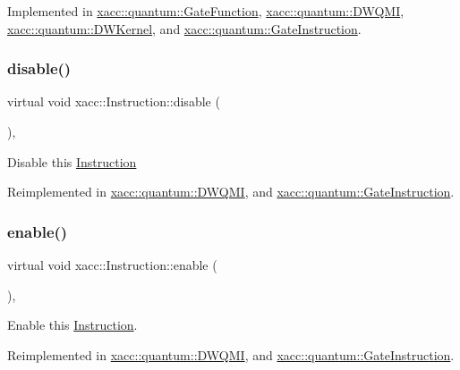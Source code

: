 Implemented in \hyperlink{a01249_aba03de68b76a9e120705c3c389c714a1}{xacc\+::quantum\+::\+Gate\+Function}, \hyperlink{a01225_a76939c29e4763d10c57ea9a270229421}{xacc\+::quantum\+::\+D\+W\+Q\+MI}, \hyperlink{a01221_adae68964db6acd8b4c2267c270a8ec58}{xacc\+::quantum\+::\+D\+W\+Kernel}, and \hyperlink{a01253_ad32ad03dfc516e00093030e60178003d}{xacc\+::quantum\+::\+Gate\+Instruction}.

\mbox{\label{a01657_a6e528da15e05a94cc1d7db268c483271}} 
\subsubsection{\texorpdfstring{disable()}{disable()}}
{\footnotesize\ttfamily virtual void xacc\+::\+Instruction\+::disable (\begin{DoxyParamCaption}{ }\end{DoxyParamCaption})\hspace{0.3cm}{\ttfamily [inline]}, {\ttfamily [virtual]}}

Disable this \hyperlink{a01657}{Instruction} 

Reimplemented in \hyperlink{a01225_af6d9120d8f60984767a330d5cfe9140f}{xacc\+::quantum\+::\+D\+W\+Q\+MI}, and \hyperlink{a01253_a63ce138dd71fb43d303f5600fefb7215}{xacc\+::quantum\+::\+Gate\+Instruction}.

\mbox{\label{a01657_a0b4f2e5a591af28342a3c08e4305e24f}} 
\subsubsection{\texorpdfstring{enable()}{enable()}}
{\footnotesize\ttfamily virtual void xacc\+::\+Instruction\+::enable (\begin{DoxyParamCaption}{ }\end{DoxyParamCaption})\hspace{0.3cm}{\ttfamily [inline]}, {\ttfamily [virtual]}}

Enable this \hyperlink{a01657}{Instruction}. 

Reimplemented in \hyperlink{a01225_ae4f563cead75aaa43f06db83e90ee855}{xacc\+::quantum\+::\+D\+W\+Q\+MI}, and \hyperlink{a01253_a7a80474b7fd465271b3313432db2e608}{xacc\+::quantum\+::\+Gate\+Instruction}.

